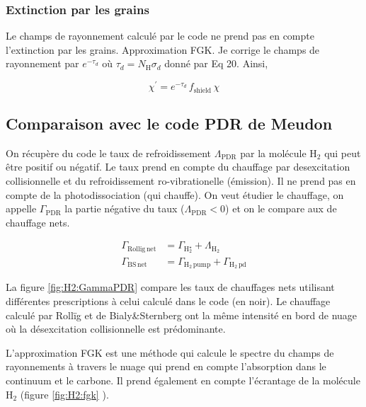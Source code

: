 \subsubsection{Extinction par les grains}

Le champs de rayonnement calculé par le code ne prend pas en compte l'extinction par les grains. Approximation FGK. Je corrige le champs de rayonnement par $e^{-\tau_d}$ où $\tau_d = N_\mathrm{H}\sigma_d$ donné par \cite{SternbergLePetit2014} Eq 20. Ainsi, 

$$\chi^{'} = e^{-\tau_d
}\, f_{\mathrm{shield}}\, \chi$$


\subsection{Comparaison avec le code PDR de Meudon}

On récupère du code le taux de refroidissement $\Lambda_{\mathrm{PDR}}$ par la molécule $\mathrm{H}_2$ qui peut être positif ou négatif. Le taux prend en compte du chauffage par desexcitation collisionnelle et du refroidissement ro-vibrationelle (émission). Il ne prend pas en compte de la photodissociation (qui chauffe). On veut étudier le chauffage, on appelle $\Gamma_{\mathrm{PDR}}$ la partie négative du taux ($\Lambda_{\mathrm{PDR}} < 0$) et on le compare aux de chauffage nets.

\begin{equation}
    \begin{split}
        \Gamma_{\mathrm{Rollig} \, \mathrm{net}} &= \Gamma_{\mathrm{H}_2^\star} + \Lambda_{\mathrm{H}_2} \\ 
        \Gamma_{\mathrm{BS} \, \mathrm{net}} &=\Gamma_{\mathrm{H}_2 \, \mathrm{pump}} +  \Gamma_{\mathrm{H}_2 \, \mathrm{pd}} 
    \end{split}
\end{equation}

La figure \ref{fig:H2:GammaPDR} compare les taux de chauffages nets utilisant différentes prescriptions à celui calculé dans le code (en noir). Le chauffage calculé par Rollïg et de Bialy&Sternberg ont la même intensité en bord de nuage où la désexcitation collisionnelle est prédominante. 

L'approximation FGK est une méthode qui calcule le spectre du champs de rayonnements à travers le nuage qui prend en compte l'absorption dans le continuum et le carbone. Il prend également en compte l'écrantage de la molécule $\mathrm{H}_2$ (figure \ref{fig:H2:fgk} \cite{FGK}). 

